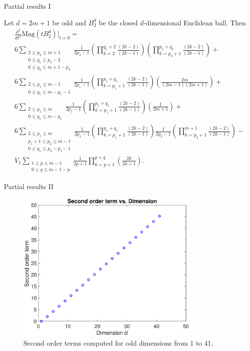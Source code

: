 \documentclass[12pt]{beamer}
\begin{document}
\begin{frame}{Partial results I}

Let $d=2m+1$ be odd and $B_2^d$ be the closed $d$-dimensional Euclidean ball. Then
\scriptsize
\begin{align*}
&\frac{d^2}{dt^2}\text{Mag}(tB_2^d)\big\vert_{t=0} = \\
&6\sum\limits_{\substack{2\leq p_2\leq m+1 \\ 0\leq q_1 \leq p_2-2 \\ 0\leq q_2 \leq m+1-p_2}}\frac{1}{2p_2-1}\left(\prod\limits_{k=2}^{q_1+2}\frac{(2k-2)}{(2k-1)}\right)\left(\prod\limits_{k=p_2+1}^{p_2+q_2}\frac{(2k-2)}{(2k-1)}\right) + \\
&6\sum\limits_{\substack{2\leq p_1\leq m-1 \\ 0\leq q_1\leq m-p_1-1}}\frac{1}{2p_1-1}\left(\prod\limits_{k=p_1+1}^{p_1+q_1}\frac{(2k-2)}{(2k-1)}\right)\left(\frac{2m}{(2m-1)(2m+1)}\right) + \\
&6\sum\limits_{\substack{2\leq p_1\leq m \\ 0\leq q_1\leq m-p_1}}\frac{1}{2p_1-1}\left(\prod\limits_{k=p_1+1}^{p_1+q_1}\frac{(2k-2)}{(2k-1)}\right)\left(\frac{1}{2m+1}\right) + \\
&6\sum\limits_{\substack{2\leq p_1\leq m \\ p_1+1\leq p_2 \leq m-1 \\ 0\leq q_1\leq p_2-p_1-1 }}\frac{1}{2p_1-1}\left(\prod\limits_{k=p_1+1}^{p_1+q_1}\frac{(2k-2)}{(2k-1)}\right)\frac{1}{2p_2-1}\left(\prod\limits_{k=p_2+1}^{m+1}\frac{(2k-2)}{(2k-1)}\right) - \\
&V_{1}\sum\limits_{\substack{1\leq p \leq m-1 \\ 0 \leq q \leq m - 1 - p}}\frac{1}{2p+1}\prod\limits_{k=p+1}^{p+q}\left(\frac{2k}{2k+1}\right).
\end{align*}
\normalsize

\end{frame}

\begin{frame}{Partial results II}
\begin{figure}
\centerline{\includegraphics[width=9cm]{secs.eps}}\caption{\label{fig:secondsplot} Second order terms computed for odd dimensions from 1 to 41.}
\end{figure}
\end{frame}
\end{document}
